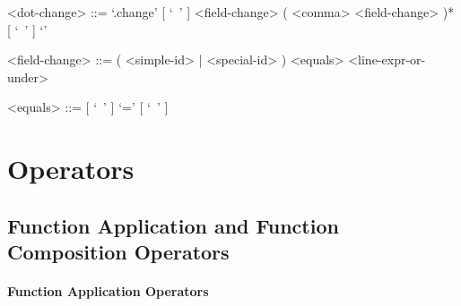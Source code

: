 \documentclass[diploma]{softlab-thesis}
\begin{document}
\begin{itemize}
\begin{grammar}
<dot-change> ::=
`.change{' [ `\ ' ] <field-change> ( <comma> <field-change> )* [ `\ ' ] `}'

<field-change> ::= ( <simple-id> | <special-id> ) <equals> <line-expr-or-under>

<equals> ::= [ `\ ' ] `=' [ `\ ' ]
\end{grammar}

\end{itemize}

\section{Operators}

\subsection{Function Application and Function Composition Operators}

\paragraph{Function Application Operators}
\end{document}
